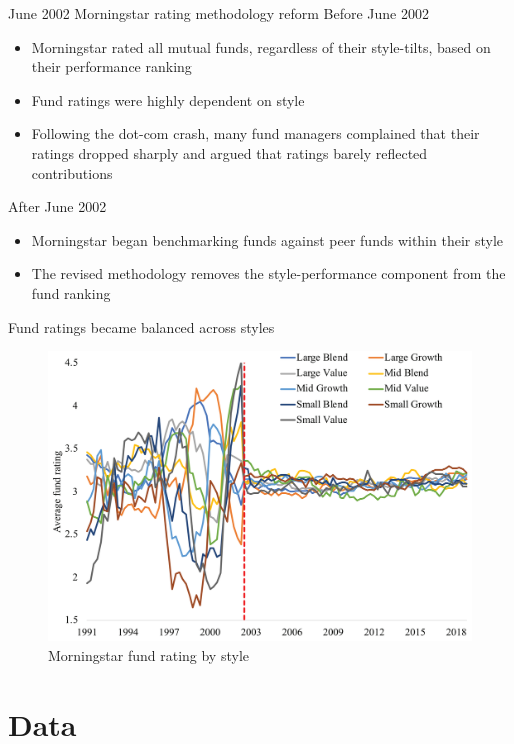 \documentclass[UTF8, 16pt]{beamer}
\begin{document}
\begin{CJK*}{UTF8}{gbsn}
\begin{frame}{June 2002 Morningstar rating methodology reform}
	\alert{Before} June 2002
	\begin{itemize}
		\item Morningstar rated all mutual funds, \alert{regardless of their style-tilts}, based on their performance ranking
		\item Fund ratings were highly dependent on style
		\item Following the \alert{dot-com crash}, many fund managers complained that their ratings dropped sharply and argued that ratings barely reflected  contributions
	\end{itemize}
	\alert{After} June 2002
	\begin{itemize}
		\item Morningstar began benchmarking funds against peer funds \alert{within their style}
		\item The revised methodology removes the style-performance component from the fund ranking
	\end{itemize}
\end{frame}

\begin{frame}{Fund ratings became balanced across styles}
	\begin{figure}[htpb] 
        \begin{center}
            \includegraphics[width=0.85 \linewidth]{pic/fund_rating_by_style.png}
        \end{center}
        \caption{Morningstar fund rating by style}
    \end{figure}
\end{frame}

\section{Data}


\end{CJK*}
\end{document}
